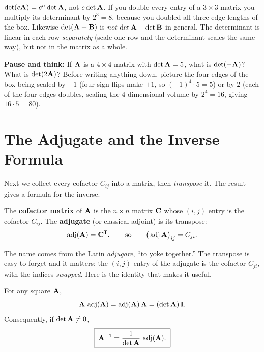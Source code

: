 \begin{trapbox}
$\det(c\mathbf{A})=c^n\det\mathbf{A}$, not $c\det\mathbf{A}$. If you double every entry of a $3\times3$ matrix you
multiply its determinant by $2^3=8$, because you doubled all three edge-lengths of the box. Likewise
$\det(\mathbf{A}+\mathbf{B})$ is \emph{not} $\det\mathbf{A}+\det\mathbf{B}$ in general. The determinant is linear in
each row \emph{separately} (scale one row and the determinant scales the same way), but not in the
matrix as a whole.
\end{trapbox}

\begin{labbox}
\textbf{Pause and think:} If $\mathbf{A}$ is a $4\times4$ matrix with $\det\mathbf{A} = 5$, what is $\det(-\mathbf{A})$?
What is $\det(2\mathbf{A})$? Before writing anything down, picture the four edges of the box being scaled
by $-1$ (four sign flips make $+1$, so $(-1)^4\cdot 5 = 5$) or by $2$ (each of the four edges doubles,
scaling the 4-dimensional volume by $2^4 = 16$, giving $16\cdot 5 = 80$).
\end{labbox}

\section{The Adjugate and the Inverse Formula}

Next we collect every cofactor $C_{ij}$ into a matrix, then \emph{transpose} it. The result gives
a formula for the inverse.

\begin{definition}[Adjugate]\label{ch22:def-adj}
The \textbf{cofactor matrix} of $\mathbf{A}$ is the $n\times n$ matrix $\mathbf{C}$ whose $(i,j)$ entry is the
cofactor $C_{ij}$. The \textbf{adjugate} (or classical adjoint) is its transpose:
\[
\operatorname{adj}(\mathbf{A}) = \mathbf{C}^{\mathsf{T}},
\qquad\text{so}\qquad
\big(\operatorname{adj}\mathbf{A}\big)_{ij} = C_{ji}.
\]
\end{definition}

The name comes from the Latin \emph{adjugare}, ``to yoke together.'' The transpose is easy to forget
and it matters: the $(i,j)$ entry of the adjugate is the cofactor $C_{ji}$, with the indices
\emph{swapped}. Here is the identity that makes it useful.

\begin{theorem}\label{ch22:thm-adj}
For any square $\mathbf{A}$,
\[
\mathbf{A}\,\operatorname{adj}(\mathbf{A}) = \operatorname{adj}(\mathbf{A})\,\mathbf{A} = (\det\mathbf{A})\,\mathbf{I}.
\]
Consequently, if $\det\mathbf{A}\neq 0$,
\[
\boxed{\;\mathbf{A}^{-1} = \frac{1}{\det\mathbf{A}}\,\operatorname{adj}(\mathbf{A}).\;}
\]
\end{theorem}

